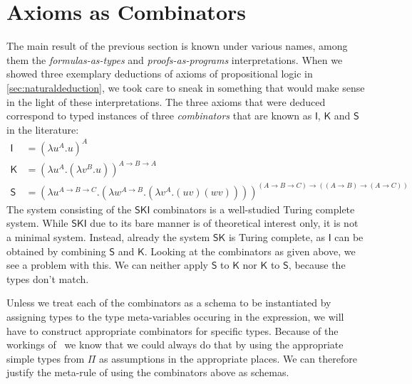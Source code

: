 \section{Axioms as Combinators}
\label{section:ski}

The main result of the previous section is known under various names, among them
the \textit{formulas-as-types} and \textit{proofs-as-programs} interpretations.
When we showed three exemplary deductions of axioms of propositional logic in
\ref{sec:naturaldeduction}, we took care to sneak in something that would make
sense in the light of these interpretations. The three axioms that were deduced
correspond to typed instances of three \textit{combinators} that are known as
$\mathsf{I}$, $\mathsf{K}$ and $\mathsf{S}$ in the literature:
\begin{align*}
\mathsf{I} &=
  (\lambda u^A.u)^A \\
\mathsf{K} &=
  (\lambda u^A.
     (\lambda v^B.u)
  )^{A \to B \to A} \\
\mathsf{S} &=
  (\lambda u^{A \to B \to C}.
     (\lambda w^{A \to B}.
       (\lambda v^A.(uv)(wv))
     )
  )^{(A \to B \to C) \to ((A \to B) \to (A \to C))}
\end{align*}
The system consisting of the $\mathsf{SKI}$ combinators is a well-studied Turing
complete system. While $\mathsf{SKI}$ due to its bare manner is of theoretical
interest only, it is not a minimal system. Instead, already the system
$\mathsf{SK}$ is Turing complete, as $\mathsf{I}$ can be obtained by combining
$\mathsf{S}$ and $\mathsf{K}$. Looking at the combinators as given above, we see
a problem with this. We can neither apply $\mathsf{S}$ to $\mathsf{K}$ nor
$\mathsf{K}$ to $\mathsf{S}$, because the types don't match.

Unless we treat each of the combinators as a schema to be instantiated by
assigning types to the type meta-variables occuring in the expression, we will
have to construct appropriate combinators for specific types. Because of the
workings of \implnpi\ we know that we could always do that by using the
appropriate simple types from $\Pi$ as assumptions in the appropriate places. We
can therefore justify the meta-rule of using the combinators above as schemas.


